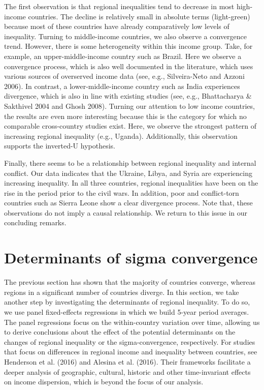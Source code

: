 \documentclass[10pt]{article}
\begin{document}
The first observation is that regional inequalities tend to decrease in most high-income countries. The decline is relatively small in absolute terms (light-green) because most of these countries have already comparatively low levels of inequality. Turning to middle-income countries, we also observe a convergence trend. However, there is some heterogeneity within this income group. Take, for example, an upper-middle-income country such as Brazil. Here we observe a convergence process, which is also well documented in the literature, which uses various sources of overserved income data (see, e.g., Silveira-Neto and Azzoni 2006). In contrast, a lower-middle-income country such as India experiences divergence, which is also in line with existing studies (see, e.g., Bhattacharya \& Sakthivel 2004 and Ghosh 2008). Turning our attention to low income countries, the results are even more interesting because this is the category for which no comparable cross-country studies exist. Here, we observe the strongest pattern of increasing regional inequality (e.g., Uganda). Additionally, this observation supports the inverted-U hypothesis.

Finally, there seems to be a relationship between regional inequality and internal conflict. Our data indicates that the Ukraine, Libya, and Syria are experiencing increasing inequality. In all three countries, regional inequalities have been on the rise in the period prior to the civil wars. In addition, poor and conflict-torn countries such as Sierra Leone show a clear divergence process. Note that, these observations do not imply a causal relationship. We return to this issue in our concluding remarks.

\section{Determinants of sigma convergence}
The previous section has shown that the majority of countries converge, whereas regions in a significant number of countries diverge. In this section, we take another step by investigating the determinants of regional inequality. To do so, we use panel fixed-effects regressions in which we build 5-year period averages. The panel regressions focus on the within-country variation over time, allowing us to derive conclusions about the effect of the potential determinants on the changes of regional inequality or the sigma-convergence, respectively. For studies that focus on differences in regional income and inequality between countries, see Henderson et al. (2016) and Alesina et al. (2016). Their frameworks facilitate a deeper analysis of geographic, cultural, historic and other time-invariant effects on income dispersion, which is beyond the focus of our analysis.
\end{document}
